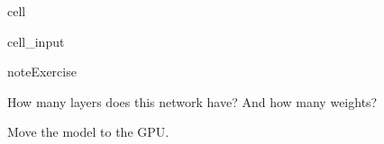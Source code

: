 \documentclass[letterpaper,10pt,english]{jupyterBook}
\begin{document}
\begin{sphinxuseclass}{cell}
\begin{sphinxVerbatimInput}
\begin{sphinxuseclass}{cell_input}
\begin{sphinxVerbatim}[commandchars=\\\{\}]
      
          
          
          
          
           
           
          
          
          
         
    
  
\end{sphinxVerbatim}

\end{sphinxuseclass}\end{sphinxVerbatimInput}

\end{sphinxuseclass}
\begin{sphinxadmonition}{note}{Exercise}

\sphinxAtStartPar
How many layers does this network have? And how many weights?
\end{sphinxadmonition}

\sphinxAtStartPar
Move the model to the GPU.
\end{document}
